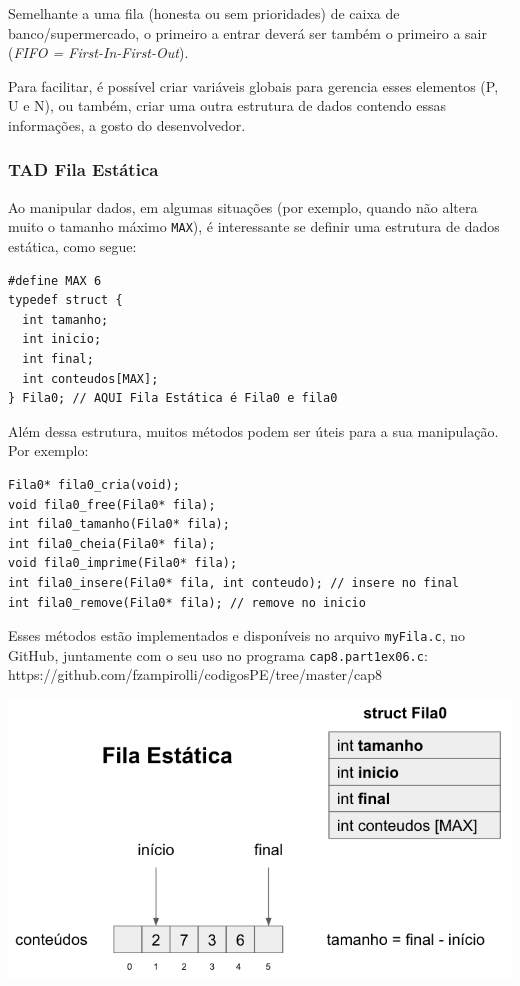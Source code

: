 \documentclass[12pt,a4paper]{article}
\begin{document}
Semelhante a uma fila (honesta ou sem prioridades) de caixa de
banco/supermercado, o primeiro a entrar deverá ser também o primeiro a
sair (\emph{FIFO = First-In-First-Out}).

Para facilitar, é possível criar variáveis globais para gerencia esses
elementos (P, U e N), ou também, criar uma outra estrutura de dados
contendo essas informações, a gosto do desenvolvedor.

    \hypertarget{tad-fila-estuxe1tica}{%
\subsubsection{TAD Fila Estática}\label{tad-fila-estuxe1tica}}

    Ao manipular dados, em algumas situações (por exemplo, quando não altera
muito o tamanho máximo \texttt{MAX}), é interessante se definir uma
estrutura de dados estática, como segue:

\begin{verbatim}
#define MAX 6
typedef struct {
  int tamanho;
  int inicio;
  int final;
  int conteudos[MAX];
} Fila0; // AQUI Fila Estática é Fila0 e fila0
\end{verbatim}

Além dessa estrutura, muitos métodos podem ser úteis para a sua
manipulação. Por exemplo:

\begin{verbatim}
Fila0* fila0_cria(void);
void fila0_free(Fila0* fila);
int fila0_tamanho(Fila0* fila);
int fila0_cheia(Fila0* fila);
void fila0_imprime(Fila0* fila);
int fila0_insere(Fila0* fila, int conteudo); // insere no final
int fila0_remove(Fila0* fila); // remove no inicio
\end{verbatim}

Esses métodos estão implementados e disponíveis no arquivo
\texttt{myFila.c}, no GitHub, juntamente com o seu uso no programa
\texttt{cap8.part1ex06.c}:
https://github.com/fzampirolli/codigosPE/tree/master/cap8

\includegraphics{"figs/cap8_4.png"}
\end{document}
